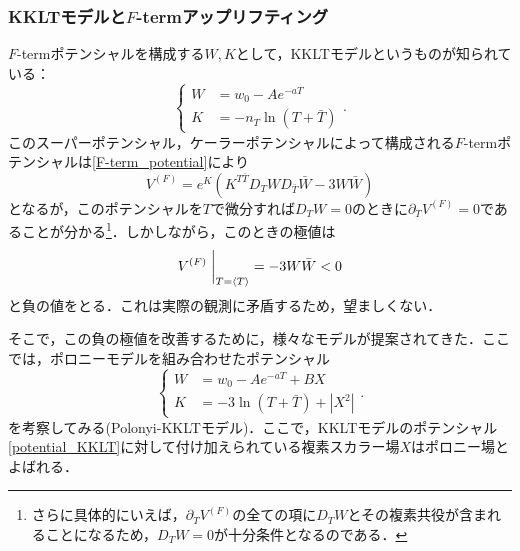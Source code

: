 \documentclass[a4paper,uplatex,dvipdfmx]{jsarticle}
\theoremstyle{definition}
\begin{document}
\subsubsection{KKLTモデルと\texorpdfstring{$F$}{F}-termアップリフティング}

$F$-termポテンシャルを構成する$W,K$として，KKLTモデル\cite{Kachru_SitterVacua_2003}というものが知られている：
\begin{equation}
   \left\{
      \begin{alignedat}{1}
         W
         &=
         w_{0}
         -
         Ae^{-aT}
         \\
         K
         &=
         -n_{T}\ln(T+\bar{T})
      \end{alignedat}
   \right.
   .
   \label{potential_KKLT}
\end{equation}
このスーパーポテンシャル，ケーラーポテンシャルによって構成される$F$-termポテンシャルは\eqref{F-term_potential}により
\begin{equation}
   V^{(F)}
   =
   e^{K}
   \left(
      K^{T\bar{T}}D_{T}WD_{\bar{T}}\bar{W}
      -
      3W\bar{W}
   \right)
   \nonumber
\end{equation}
となるが，このポテンシャルを$T$で微分すれば$D_{T}W=0$のときに$\partial_{T}V^{(F)}=0$であることが分かる\footnote{
   さらに具体的にいえば，$\partial_{T}V^{(F)}$の全ての項に$D_{T}W$とその複素共役が含まれることになるため，$D_{T}W=0$が十分条件となるのである．
}．しかしながら，このときの極値は
\begin{equation}
   V^{(F)}
   \left.\vphantom{\frac{1}{2}}\right|_{T=\ev*{T}}
   =
   -3W\bar{W}
   <
   0
\end{equation}
と負の値をとる．これは実際の観測に矛盾するため，望ましくない．

そこで，この負の極値を改善するために，様々なモデルが提案されてきた．ここでは，ポロニーモデル\cite{Polonyi_GeneralizationMassive_1977}を組み合わせたポテンシャル
\begin{equation}
   \left\{
      \begin{alignedat}{1}
         W
         &=
         w_{0}
         -
         Ae^{-aT}
         +
         BX
         \\
         K
         &=
         -
         3\ln(T+\bar{T})
         +
         |X^2|
      \end{alignedat}
   \right.
   .
   \label{potential_Polonyi-KKLT}
\end{equation}
を考察してみる(Polonyi-KKLTモデル)．ここで，KKLTモデルのポテンシャル\eqref{potential_KKLT}に対して付け加えられている複素スカラー場$X$はポロニー場とよばれる．
\end{document}
